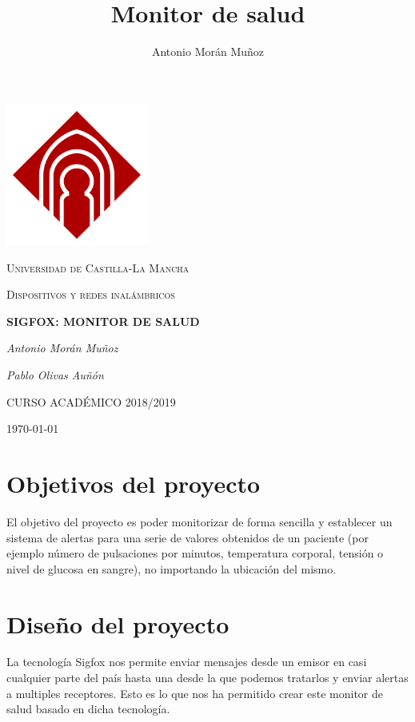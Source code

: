 \documentclass[12pt,a4paper]{article}
\author{Antonio Morán Muñoz}
\title{Monitor de salud}
\begin{document}
 

\begin{titlepage}
\thispagestyle{empty}
\centering
	\includegraphics[width=0.35\textwidth]{castilla.png}\par\vspace{1cm}
	{\scshape\LARGE Universidad de Castilla-La Mancha \par}
	\vspace{1cm}
	{\scshape\Large Dispositivos y redes inalámbricos\par}
	\vspace{1.5cm}
	{\huge\bfseries SIGFOX: MONITOR DE SALUD\par}
	\vspace{2cm}
	{\Large\itshape Antonio Morán Muñoz\par}
	{\Large\itshape Pablo Olivas Auñón\par}

	\vfill

	{CURSO ACADÉMICO 2018/2019}
	\vfill
	{\large \today\par}
\end{titlepage}

\thispagestyle{empty}
\newpage

\tableofcontents
\listoffigures

\newpage

\section{Objetivos del proyecto}
El objetivo del proyecto es poder monitorizar de forma sencilla y establecer un sistema de alertas para una serie de valores obtenidos de un paciente (por ejemplo número de pulsaciones por minutos, temperatura corporal, tensión o nivel de glucosa en sangre), no importando la ubicación del mismo.

\section{Diseño del proyecto}
La tecnología Sigfox nos permite enviar mensajes desde un emisor en casi cualquier parte del país hasta una desde la que podemos tratarlos y enviar alertas a multiples receptores. Esto es lo que nos ha permitido crear este monitor de salud basado en dicha tecnología.\\ 
\end{document}

